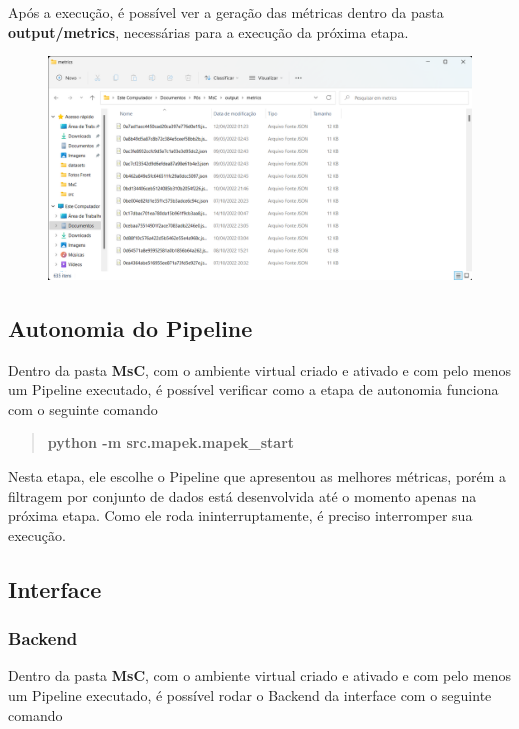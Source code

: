 \documentclass[letterpaper]{article}
\begin{document}
Após a execução, é possível ver a geração das métricas dentro da pasta \textbf{output/metrics}, necessárias para a execução da próxima etapa.

\begin{figure}[h!]
\centering
\includegraphics[scale=0.25]{images/metrics.png}
\label{fig:DocInstallMetrics}
\end{figure}

\subsection{Autonomia do Pipeline}

Dentro da pasta \textbf{MsC}, com o ambiente virtual criado e ativado e com pelo menos um Pipeline executado, é possível verificar como a etapa de autonomia funciona com o seguinte comando

\begin{quote}\textbf{python -m src.mapek.mapek\_start}\end{quote}

Nesta etapa, ele escolhe o Pipeline que apresentou as melhores métricas, porém a filtragem por conjunto de dados está desenvolvida até o momento apenas na próxima etapa. Como ele roda ininterruptamente, é preciso interromper sua execução.

\subsection{Interface}

\subsubsection{Backend}

Dentro da pasta \textbf{MsC}, com o ambiente virtual criado e ativado e com pelo menos um Pipeline executado, é possível rodar o Backend da interface com o seguinte comando
\end{document}
